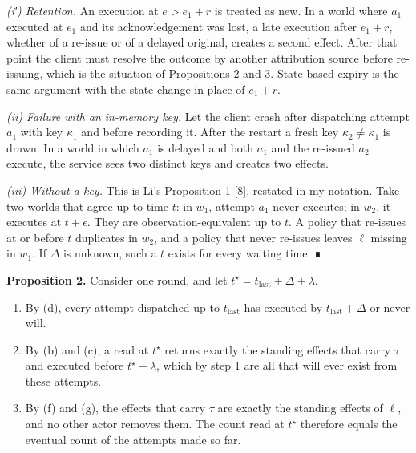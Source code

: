 \documentclass[
  10pt,
]{article}
\providecommand{\tightlist}{%
  \setlength{\itemsep}{0pt}\setlength{\parskip}{0pt}}
\begin{document}
\emph{(i′) Retention.} An execution at \(e > e_1 + r\) is treated as
new. In a world where \(a_1\) executed at \(e_1\) and its
acknowledgement was lost, a late execution after \(e_1 + r\), whether of
a re-issue or of a delayed original, creates a second effect. After that
point the client must resolve the outcome by another attribution source
before re-issuing, which is the situation of Propositions 2 and 3.
State-based expiry is the same argument with the state change in place
of \(e_1 + r\).

\emph{(ii) Failure with an in-memory key.} Let the client crash after
dispatching attempt \(a_1\) with key \(\kappa_1\) and before recording
it. After the restart a fresh key \(\kappa_2 \neq \kappa_1\) is drawn.
In a world in which \(a_1\) is delayed and both \(a_1\) and the
re-issued \(a_2\) execute, the service sees two distinct keys and
creates two effects.

\emph{(iii) Without a key.} This is Li's Proposition 1 {[}8{]}, restated
in my notation. Take two worlds that agree up to time \(t\): in \(w_1\),
attempt \(a_1\) never executes; in \(w_2\), it executes at
\(t + \epsilon\). They are observation-equivalent up to \(t\). A policy
that re-issues at or before \(t\) duplicates in \(w_2\), and a policy
that never re-issues leaves \(\ell\) missing in \(w_1\). If \(\Delta\)
is unknown, such a \(t\) exists for every waiting time. ∎

\textbf{Proposition 2.} Consider one round, and let
\(t^\star = t_{\text{last}} + \Delta + \lambda\).

\begin{enumerate}
\def\labelenumi{\arabic{enumi}.}
\tightlist
\item
  By (d), every attempt dispatched up to \(t_{\text{last}}\) has
  executed by \(t_{\text{last}} + \Delta\) or never will.
\item
  By (b) and (c), a read at \(t^\star\) returns exactly the standing
  effects that carry \(\tau\) and executed before \(t^\star - \lambda\),
  which by step 1 are all that will ever exist from these attempts.
\item
  By (f) and (g), the effects that carry \(\tau\) are exactly the
  standing effects of \(\ell\), and no other actor removes them. The
  count read at \(t^\star\) therefore equals the eventual count of the
  attempts made so far.
\end{enumerate}
\end{document}
